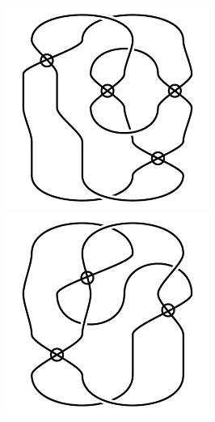 \begin{figure}[H]
\begin{minipage}[b]{.18\linewidth}
\centering
\includegraphics[width=\linewidth]{../data/virtual_4_87.png}
\end{minipage}
\begin{minipage}[b]{.18\linewidth}
\centering
\includegraphics[width=\linewidth]{../data/virtual_4_88.png}

\end{minipage}
\end{figure}
